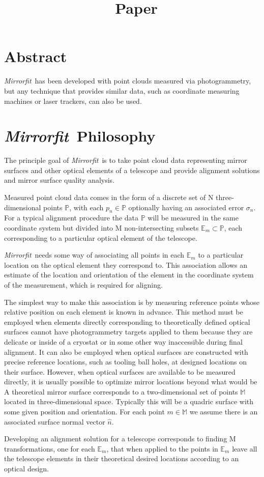 \documentclass{article}
\title{\mf\ Paper}
\newcommand{\mf}{\textit{Mirrorfit}}
\newcommand{\sfont}[1]{\mathbb{#1}}
\begin{document}
\section{Abstract}

\mf\ has been developed with point clouds measured via photogrammetry, but any technique that provides similar data, such as coordinate measuring machines or laser trackers, can also be used. 
\section{\mf\ Philosophy}

The principle goal of \mf\ is to take point cloud data representing mirror surfaces and other optical elements of a telescope and provide alignment solutions and mirror surface quality analysis.

Measured point cloud data comes in the form of a discrete set of N three-dimensional points $\sfont{P}$, with each $p_n \in \sfont{P}$ optionally having an associated error $\sigma_{n}$. 
For a typical alignment procedure the data $\sfont{P}$ will be measured in the same coordinate system but divided into M non-intersecting subsets $\sfont{E}_m \subset \sfont{P}$, each corresponding to a particular optical element of the telescope.

\mf\ needs some way of associating all points in each $\sfont{E}_m$ to a particular location on the optical element they correspond to.
This association allows an estimate of the location and orientation of the element in the coordinate system of the measurement, which is required for aligning. 

The simplest way to make this association is by measuring reference points whose relative position on each element is known in advance.
This method must be employed when elements directly corresponding to theoretically defined optical surfaces cannot have photogrammetry targets applied to them because they are delicate or inside of a cryostat or in some other way inaccessible during final alignment.
It can also be employed when optical surfaces are constructed with precise reference locations, such as tooling ball holes, at designed locations on their surface. 
However, when optical surfaces are available to be measured directly, it is usually possible to optimize mirror locations beyond what would be  
A theoretical mirror surface corresponds to a two-dimensional set of points $\sfont{M}$ located in three-dimensional space. Typically this will be a quadric surface with some given position and orientation. For each point
$m \in \sfont{M}$ we assume there is an associated surface normal vector $\hat{n}$. 

Developing an alignment solution for a telescope corresponds to finding M transformations, one for each $\sfont{E}_m$, that when applied to the points in $\sfont{E}_m$ leave all the telescope elements in their theoretical desired locations according to an optical design.
\end{document}
